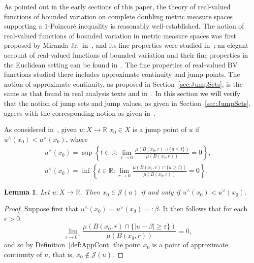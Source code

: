 \documentclass[11pt, letterpaper]{amsart} %
\newcommand*{\R}{{\mathbb R}}
\newcommand*{\eps}{\varepsilon}
\numberwithin{equation}{section}
\theoremstyle{plain}
\newtheorem{lemma}[equation]{Lemma}
\theoremstyle{definition}
\begin{document}
{As pointed out in the early sections of this paper, the theory of real-valued functions of bounded variation on complete doubling
metric measure spaces supporting a $1$-Poincar\'e inequality is reasonably well-established. The notion of real-valued
functions of bounded variation in metric measure spaces was first proposed by
Miranda Jr.~in~\cite{Miranda}, and its fine properties were studied in~\cite{Ambrosio, AMP, Lah-Fed}; an elegant
account of real-valued functions of bounded variation and their fine properties in the Euclidean setting can be 
found in~\cite{EvansGariepy}.
The fine properties of real-valued BV functions studied there includes approximate continuity and jump points.
The notion of approximate continuity, as proposed in Section~\ref{sec:JumpSets}, is the same as that found in
real analysis texts and in~\cite{Ambrosio, AMP}. In this section we will verify that the notion of jump sets and jump values,
as given in Section~\ref{sec:JumpSets}, agrees with the corresponding notion as given in~\cite{Ambrosio}.

As considered in~\cite{Ambrosio},
given $u:X\rightarrow \R$ $x_0\in X$ is a jump point of $u$ if $u^\wedge (x_0)<u^\vee (x_0)$, where
\begin{eqnarray*}
u^\wedge (x_0)=\sup\left\{ t\in\R : \lim_{r\to 0}\frac{\mu (B(x_0,r)\cap \{ u\leq t\})}{\mu (B(x_0,r))}=0 \right\}, \\
u^\vee (x_0)=\inf\left\{ t\in\R : \lim_{r\to 0}\frac{\mu (B(x_0,r)\cap \{ u\geq t\})}{\mu (B(x_0,r))}=0 \right\}.
\end{eqnarray*}

\begin{lemma}
Let $u:X\rightarrow \R$. Then $x_0\in\mathcal{J}(u)$ if and only if $u^\wedge (x_0)<u^\vee (x_0)$.
\end{lemma}

\begin{proof}
Suppose first that $u^\wedge(x_0)=u^\vee(x_0)=:\beta$. It then follows that for each $\eps>0$,
\[
\lim_{r\to 0^+}\frac{\mu(B(x_0,r)\cap\{|u-\beta|\ge\eps\})}{\mu(B(x_0,r))}=0,
\]
and so by Definition~\ref{def:AppCont} the point $x_0$ is a point of approximate continuity of $u$, that is, $x_0\not\in\mathcal{J}(u)$.


\end{proof}}
\end{document}
